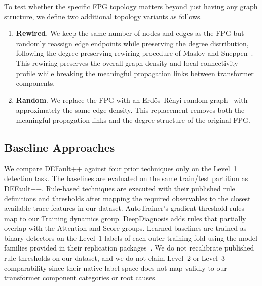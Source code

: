To test whether the specific FPG topology matters beyond just having any graph structure, we define two additional topology variants as follows.

\begin{enumerate}[nosep]
\item \textbf{Rewired}. We keep the same number of nodes and edges as the FPG but randomly reassign edge endpoints while preserving the degree distribution, following the degree-preserving rewiring procedure of Maslov and Sneppen~\cite{maslov2002specificity}. This rewiring preserves the overall graph density and local connectivity profile while breaking the meaningful propagation links between transformer components.
\item \textbf{Random}. We replace the FPG with an Erd\H{o}s--R\'{e}nyi random graph~\cite{erdos1959random} with approximately the same edge density. This replacement removes both the meaningful propagation links and the degree structure of the original FPG.
\end{enumerate}

\subsection{Baseline Approaches}

We compare DEFault++ against four prior techniques only on the Level~1 detection task. The baselines are evaluated on the same train/test partition as DEFault++. Rule-based techniques are executed with their published rule definitions and thresholds after mapping the required observables to the closest available trace features in our dataset. AutoTrainer's gradient-threshold rules map to our Training dynamics group. DeepDiagnosis adds rules that partially overlap with the Attention and Score groups. Learned baselines are trained as binary detectors on the Level~1 labels of each outer-training fold using the model families provided in their replication packages~\cite{autotrainer,deepdiagnosis,deepfd,default}. We do not recalibrate published rule thresholds on our dataset, and we do not claim Level~2 or Level~3 comparability since their native label space does not map validly to our transformer component categories or root causes.

